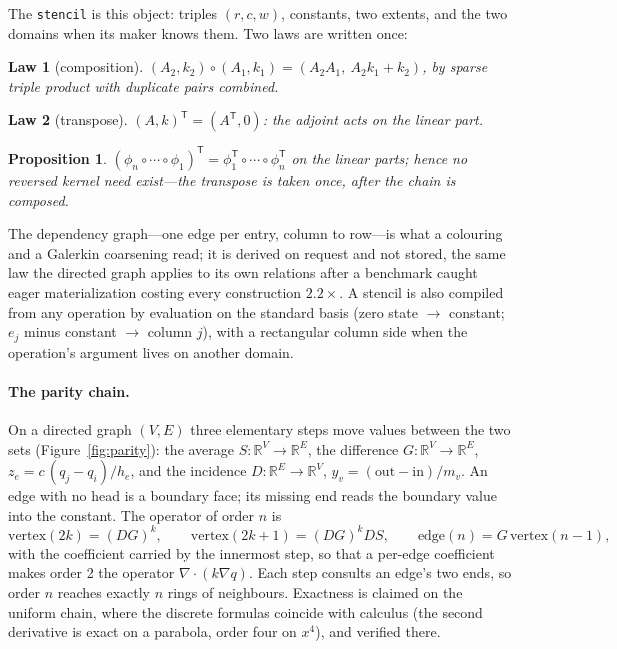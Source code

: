 \documentclass[11pt,a4paper]{article}
\newtheorem{law}{Law}
\newtheorem{proposition}{Proposition}
\newcommand{\tr}{^{\mathsf T}}
\newcommand{\R}{\mathbb R}
\newcommand{\code}[1]{\texttt{#1}}
\begin{document}
The \code{stencil} is this object: triples $(r,c,w)$, constants, two extents, and the two domains when its maker knows them. Two laws are written once:
\begin{law}[composition]\label{law:comp}
$(A_2,k_2)\circ(A_1,k_1) = (A_2A_1,\ A_2k_1+k_2)$, by sparse triple product with duplicate pairs combined.
\end{law}
\begin{law}[transpose]\label{law:tr}
$(A,k)\tr = (A\tr,0)$: the adjoint acts on the linear part.
\end{law}
\begin{proposition}\label{prop:norev}
$(\phi_n\circ\cdots\circ\phi_1)\tr = \phi_1\tr\circ\cdots\circ\phi_n\tr$ on the linear parts; hence no reversed kernel need exist---the transpose is taken once, after the chain is composed.
\end{proposition}

The dependency graph---one edge per entry, column to row---is what a colouring and a Galerkin coarsening read; it is derived on request and not stored, the same law the directed graph applies to its own relations after a benchmark caught eager materialization costing every construction $2.2\times$. A stencil is also compiled from any operation by evaluation on the standard basis (zero state $\to$ constant; $e_j$ minus constant $\to$ column $j$), with a rectangular column side when the operation's argument lives on another domain.

\paragraph{The parity chain.} On a directed graph $(V,E)$ three elementary steps move values between the two sets (Figure~\ref{fig:parity}): the average $S:\R^V\to\R^E$, the difference $G:\R^V\to\R^E$, $z_e = c\,(q_j-q_i)/h_e$, and the incidence $D:\R^E\to\R^V$, $y_v = (\text{out}-\text{in})/m_v$. An edge with no head is a boundary face; its missing end reads the boundary value into the constant. The operator of order $n$ is
\[
\text{vertex}(2k) = (DG)^k,\qquad \text{vertex}(2k{+}1) = (DG)^kDS,\qquad \text{edge}(n) = G\,\text{vertex}(n{-}1),
\]
with the coefficient carried by the innermost step, so that a per-edge coefficient makes order 2 the operator $\nabla\!\cdot(k\nabla q)$. Each step consults an edge's two ends, so order $n$ reaches exactly $n$ rings of neighbours. Exactness is claimed on the uniform chain, where the discrete formulas coincide with calculus (the second derivative is exact on a parabola, order four on $x^4$), and verified there.
\end{document}
